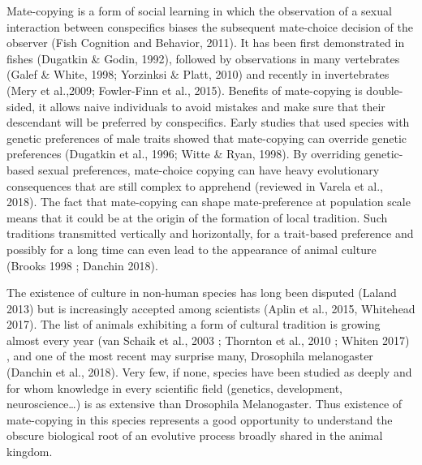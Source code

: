 \documentclass[a4paper, 12pt]{article}
\begin{document}
	Mate-copying is a form of social learning in which the observation of a sexual interaction between conspecifics biases the subsequent mate-choice decision of the observer (Fish Cognition and Behavior, 2011). It has been first demonstrated in fishes (Dugatkin \& Godin, 1992), followed by observations in many vertebrates (Galef \& White, 1998; Yorzinksi \& Platt, 2010) and recently in invertebrates (Mery et al.,2009; Fowler-Finn et al., 2015). Benefits of mate-copying is double-sided, it allows naive individuals to avoid mistakes and make sure that their descendant will be preferred by conspecifics. Early studies that used species with genetic preferences of male traits showed that mate-copying can override genetic preferences (Dugatkin et al., 1996; Witte \& Ryan, 1998). By overriding genetic-based sexual preferences, mate-choice copying can have heavy evolutionary consequences that are still complex to apprehend (reviewed in Varela et al., 2018). The fact that mate-copying can shape mate-preference at population scale means that it could be at the origin of the formation of local tradition. Such traditions transmitted vertically and horizontally, for a trait-based preference and possibly for a long time can even lead to the appearance of animal culture (Brooks 1998 ; Danchin 2018).
	
	The existence of culture in non-human species has long been disputed (Laland 2013) but is increasingly accepted among scientists (Aplin et al., 2015, Whitehead 2017). The list of animals exhibiting a form of cultural tradition is growing almost every year (van Schaik et al., 2003 ; Thornton et al., 2010 ; Whiten 2017) , and one of the most recent may surprise many, Drosophila melanogaster (Danchin et al., 2018). Very few, if none, species have been studied as deeply and for whom knowledge in every scientific field (genetics, development, neuroscience…) is as extensive than Drosophila Melanogaster. Thus existence of mate-copying in this species represents a good opportunity to understand the obscure biological root of an evolutive process broadly shared in the animal kingdom.
	
\end{document}
